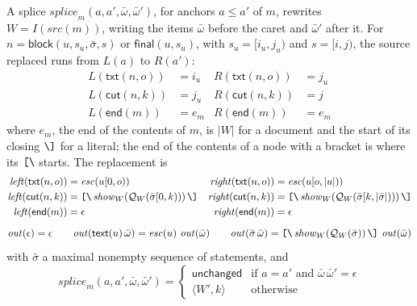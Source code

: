 \documentclass[11pt]{article}
\numberwithin{equation}{section}
\newcommand{\kw}[1]{\ensuremath{\mathsf{#1}}}
\newcommand{\str}[1]{\ensuremath{\text{\texttt{#1}}}}
\newcommand{\bs}{\textbackslash}
\newcommand{\Open}{\str{[\bs}}
\newcommand{\Close}{\str{\bs]}}
\begin{document}
A splice $\mathit{splice}_m(a, a', \bar\omega, \bar\omega')$, for anchors
$a \le a'$ of $m$, rewrites $W = I(\mathit{src}(m))$, writing the items
$\bar\omega$ before the caret and $\bar\omega'$ after it.  For $n = \kw{block}(u, s_u,
\bar\sigma, s)$ or $\kw{final}(u, s_u)$, with $s_u = [i_u, j_u)$ and $s =
[i, j)$, the source replaced runs from $\mathit{L}(a)$ to $\mathit{R}(a')$:
\begin{equation}\label{eq:splice-bounds}
\begin{aligned}
\mathit{L}(\kw{txt}(n, o)) &= i_u &
\mathit{R}(\kw{txt}(n, o)) &= j_u \\
\mathit{L}(\kw{cut}(n, k)) &= j_u &
\mathit{R}(\kw{cut}(n, k)) &= j \\
\mathit{L}(\kw{end}(m)) &= e_m &
\mathit{R}(\kw{end}(m)) &= e_m
\end{aligned}
\end{equation}
where $e_m$, the end of the contents of $m$, is $|W|$ for a document and
the start of its closing $\Close$ for a literal; the end of the contents
of a node with a bracket is where its $\Open$ starts.  The replacement is
\begin{equation}\label{eq:splice}
\begin{aligned}
\mathit{left}(\kw{txt}(n, o)) &= \mathit{esc}(u[0, o)) &
\mathit{right}(\kw{txt}(n, o)) &= \mathit{esc}(u[o, |u|)) \\
\mathit{left}(\kw{cut}(n, k)) &=
  \Open\,\mathit{show}_W(\mathcal{Q}_W(\bar\sigma[0, k)))\,\Close &
\mathit{right}(\kw{cut}(n, k)) &=
  \Open\,\mathit{show}_W(\mathcal{Q}_W(\bar\sigma[k, |\bar\sigma|)))\,\Close \\
\mathit{left}(\kw{end}(m)) &= \epsilon &
\mathit{right}(\kw{end}(m)) &= \epsilon
\end{aligned}
\end{equation}
\begin{equation}\label{eq:out}
\mathit{out}(\epsilon) = \epsilon \qquad
\mathit{out}(\kw{text}(u)\,\bar\omega) = \mathit{esc}(u)\ \mathit{out}(\bar\omega)
\qquad
\mathit{out}(\bar\sigma\,\bar\omega) =
  \Open\,\mathit{show}_W(\mathcal{Q}_W(\bar\sigma))\,\Close\ \mathit{out}(\bar\omega)
\end{equation}
with $\bar\sigma$ a maximal nonempty sequence of statements, and
\begin{equation}\label{eq:splice-def}
\mathit{splice}_m(a, a', \bar\omega, \bar\omega') =
\begin{cases}
\kw{unchanged} & \text{if } a = a' \text{ and } \bar\omega\,\bar\omega' =
  \epsilon \\
\langle W', k \rangle & \text{otherwise}
\end{cases}
\end{equation}
\end{document}
